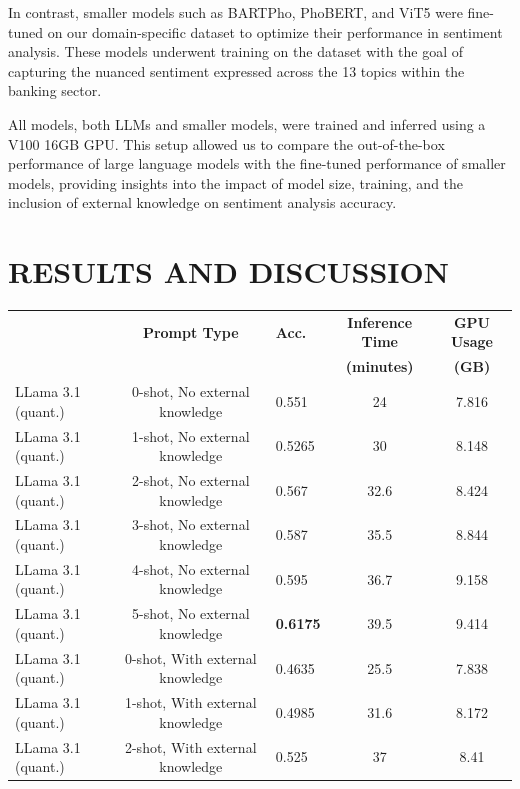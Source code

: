 {In contrast, smaller models such as BARTPho, PhoBERT, and ViT5 were fine-tuned on our domain-specific dataset to optimize their performance in sentiment analysis. These models underwent training on the dataset with the goal of capturing the nuanced sentiment expressed across the 13 topics within the banking sector.

All models, both LLMs and smaller models, were trained and inferred using a V100 16GB GPU. This setup allowed us to compare the out-of-the-box performance of large language models with the fine-tuned performance of smaller models, providing insights into the impact of model size, training, and the inclusion of external knowledge on sentiment analysis accuracy.

\section{RESULTS AND DISCUSSION}
\begin{table}[htbp]
  \small
  \setlength{\tabcolsep}{2pt} %
  \begin{center}
    \begin{tabular}{|l|c|l|c|c|}
      \hline
      & \textbf{Prompt Type} & \textbf{Acc.} & \textbf{Inference Time} &\textbf{GPU Usage}  \\ 
       &  &  & \textbf{(minutes)} & \textbf{(GB)} \\ 
      \hline LLama 3.1 (quant.) & 0-shot, No external knowledge & 0.551 & 24 & 7.816 \\ 
      \hline LLama 3.1 (quant.) & 1-shot, No external knowledge	 & 0.5265 & 30 & 8.148 \\ 
      \hline LLama 3.1 (quant.) & 2-shot, No external knowledge	 & 0.567 & 32.6 & 8.424\\
      \hline LLama 3.1 (quant.) & 3-shot, No external knowledge	 & 0.587 & 35.5 & 8.844\\
      \hline LLama 3.1 (quant.) & 4-shot, No external knowledge	 & 0.595 & 36.7 & 9.158\\
      \hline LLama 3.1 (quant.) & 5-shot, No external knowledge	 & \textbf{0.6175} & 39.5 & 9.414\\
      \hline LLama 3.1 (quant.) & 0-shot, With external knowledge & 0.4635 & 25.5 & 7.838\\ 
      \hline LLama 3.1 (quant.) & 1-shot, With external knowledge	 & 0.4985 & 31.6 & 8.172\\ 
      \hline LLama 3.1 (quant.) & 2-shot, With external knowledge	 & 0.525 & 37 & 8.41\\

\end{tabular}
\end{center}
\end{table}}
